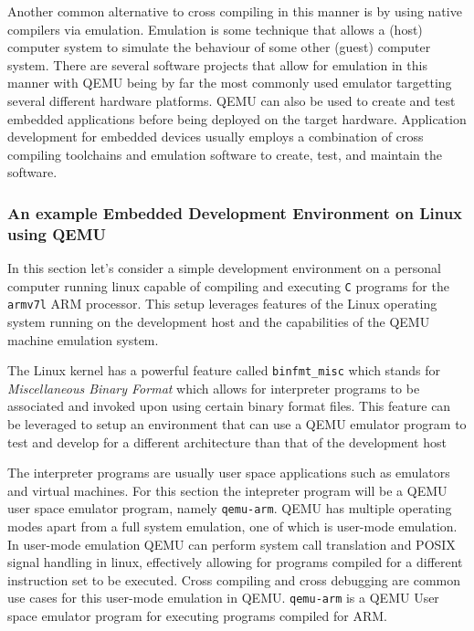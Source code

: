Another common alternative to cross compiling in this manner is by using native compilers via emulation. Emulation is some technique that allows a (host) computer system to simulate the behaviour of some other (guest) computer system. There are several software projects that allow for emulation in this manner with QEMU being by far the most commonly used emulator targetting several different hardware platforms. QEMU can also be used to create and test embedded applications before being deployed on the target hardware. Application development for embedded devices usually employs a combination of cross compiling toolchains and emulation software to create, test, and maintain the software.

\subsubsection{An example Embedded Development Environment on Linux using QEMU}


In this section let's consider a simple development environment on a personal computer running linux capable of compiling and executing \texttt{C} programs for the \texttt{armv7l} ARM processor. This setup leverages features of the Linux operating system running on the development host and the capabilities of the QEMU machine emulation system.

The Linux kernel has a powerful feature called \texttt{binfmt\_misc} which stands for \textit{Miscellaneous Binary Format} which allows for interpreter programs to be associated and invoked upon using certain binary format files. This feature can be leveraged to setup an environment that can use a QEMU emulator program to test and develop for a different architecture than that of the development host

The interpreter programs are usually user space applications such as emulators and virtual machines. For this section the intepreter program will be a QEMU user space emulator program, namely \texttt{qemu-arm}. QEMU has multiple operating modes apart from a full system emulation, one of which is user-mode emulation. In user-mode emulation QEMU can perform system call translation and POSIX signal handling in linux, effectively allowing for programs compiled for a different instruction set to be executed. Cross compiling and cross debugging are common use cases for this user-mode emulation in QEMU. \texttt{qemu-arm} is a QEMU User space emulator program for executing programs compiled for ARM.

